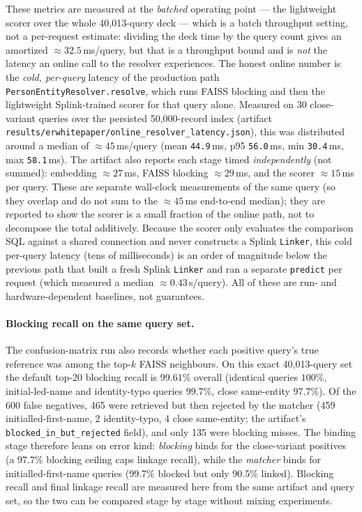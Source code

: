 \documentclass[11pt]{article}
\begin{document}
These metrics are measured at the \emph{batched} operating point --- the lightweight scorer over the whole 40{,}013-query deck --- which is a batch throughput setting, not a per-request estimate: dividing the deck time by the query count gives an amortized $\approx 32.5$\,ms/query, but that is a throughput bound and is \emph{not} the latency an online call to the resolver experiences. The honest online number is the \emph{cold, per-query} latency of the production path \texttt{PersonEntityResolver.resolve}, which runs FAISS blocking and then the lightweight Splink-trained scorer for that query alone. Measured on 30 close-variant queries over the persisted 50{,}000-record index (artifact \texttt{results/erwhitepaper/online\_resolver\_latency.json}), this was distributed around a median of $\approx 45$\,ms/query (mean \texttt{44.9}\,ms, p95 \texttt{56.0}\,ms, min \texttt{30.4}\,ms, max \texttt{58.1}\,ms). The artifact also reports each stage timed \emph{independently} (not summed): embedding $\approx 27$\,ms, FAISS blocking $\approx 29$\,ms, and the scorer $\approx 15$\,ms per query. These are separate wall-clock measurements of the same query (so they overlap and do not sum to the $\approx 45$\,ms end-to-end median); they are reported to show the scorer is a small fraction of the online path, not to decompose the total additively. Because the scorer only evaluates the comparison SQL against a shared connection and never constructs a Splink \texttt{Linker}, this cold per-query latency (tens of milliseconds) is an order of magnitude below the previous path that built a fresh Splink \texttt{Linker} and ran a separate \texttt{predict} per request (which measured a median $\approx 0.43$\,s/query). All of these are run- and hardware-dependent baselines, not guarantees.


\paragraph{Blocking recall on the same query set.} The confusion-matrix run also records whether each positive query's true reference was among the top-$k$ FAISS neighbours. On this exact 40,013-query set the default top-20 blocking recall is $99.61\%$ overall (identical queries $100\%$, initial-led-name and identity-typo queries $99.7\%$, close same-entity $97.7\%$). Of the 600 false negatives, 465 were retrieved but then rejected by the matcher (459 initialled-first-name, 2 identity-typo, 4 close same-entity; the artifact's \texttt{blocked\_in\_but\_rejected} field), and only 135 were blocking misses. The binding stage therefore leans on error kind: \emph{blocking} binds for the close-variant positives (a $97.7\%$ blocking ceiling caps linkage recall), while the \emph{matcher} binds for initialled-first-name queries (99.7\% blocked but only 90.5\% linked). Blocking recall and final linkage recall are measured here from the same artifact and query set, so the two can be compared stage by stage without mixing experiments.
\end{document}
